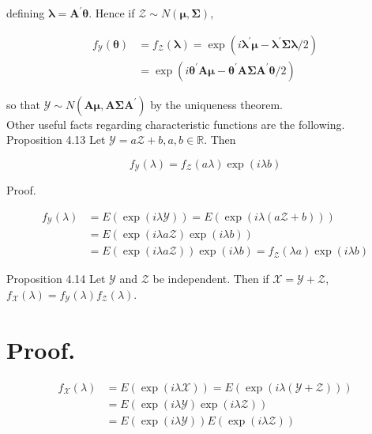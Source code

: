 \documentclass[10pt]{article}
\begin{document}
defining $\boldsymbol{\lambda}=\mathbf{A}^{\prime} \boldsymbol{\theta}$. Hence if $\mathcal{Z} \sim N(\boldsymbol{\mu}, \boldsymbol{\Sigma})$,

$$
\begin{aligned}
f_{\mathcal{Y}}(\boldsymbol{\theta}) & =f_{\mathcal{Z}}(\boldsymbol{\lambda})=\exp \left(i \boldsymbol{\lambda}^{\prime} \boldsymbol{\mu}-\boldsymbol{\lambda}^{\prime} \boldsymbol{\Sigma} \boldsymbol{\lambda} / 2\right) \\
& =\exp \left(i \boldsymbol{\theta}^{\prime} \mathbf{A} \boldsymbol{\mu}-\boldsymbol{\theta}^{\prime} \mathbf{A} \boldsymbol{\Sigma} \mathbf{A}^{\prime} \boldsymbol{\theta} / 2\right)
\end{aligned}
$$

so that $\mathcal{Y} \sim N\left(\mathbf{A} \boldsymbol{\mu}, \mathbf{A} \boldsymbol{\Sigma} \mathbf{A}^{\prime}\right)$ by the uniqueness theorem.\\
Other useful facts regarding characteristic functions are the following.\\
Proposition 4.13 Let $\mathcal{Y}=a \mathcal{Z}+b, a, b \in \mathbb{R}$. Then

$$
f_{\mathcal{Y}}(\lambda)=f_{\mathcal{Z}}(a \lambda) \exp (i \lambda b)
$$

Proof.

$$
\begin{aligned}
f_{\mathcal{Y}}(\lambda) & =E(\exp (i \lambda \mathcal{Y}))=E(\exp (i \lambda(a \mathcal{Z}+b))) \\
& =E(\exp (i \lambda a \mathcal{Z}) \exp (i \lambda b)) \\
& =E(\exp (i \lambda a \mathcal{Z})) \exp (i \lambda b)=f_{\mathcal{Z}}(\lambda a) \exp (i \lambda b)
\end{aligned}
$$

Proposition 4.14 Let $\mathcal{Y}$ and $\mathcal{Z}$ be independent. Then if $\mathcal{X}=\mathcal{Y}+\mathcal{Z}$, $f_{\mathcal{X}}(\lambda)=f_{\mathcal{Y}}(\lambda) f_{\mathcal{Z}}(\lambda)$.

\section*{Proof.}
$$
\begin{aligned}
f_{\mathcal{X}}(\lambda) & =E(\exp (i \lambda \mathcal{X}))=E(\exp (i \lambda(\mathcal{Y}+\mathcal{Z}))) \\
& =E(\exp (i \lambda \mathcal{Y}) \exp (i \lambda \mathcal{Z})) \\
& =E(\exp (i \lambda \mathcal{Y})) E(\exp (i \lambda \mathcal{Z}))
\end{aligned}
$$
\end{document}
